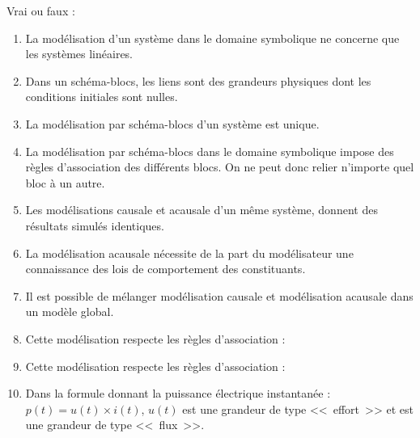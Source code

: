 \documentclass[10pt,fleqn]{article} %
\begin{document}
\def\pathfig{images}

\vspace{8cm}
\pagestyle{fancy}
\thispagestyle{plain}

\def\columnseprulecolor{\color{ocre}}
\setlength{\columnseprule}{0.4pt} 

\def\pathfig{images}


Vrai ou faux : 
\begin{enumerate}
\item La modélisation d’un système dans le domaine symbolique ne concerne que les systèmes linéaires. 
\item Dans un schéma-blocs, les liens sont des grandeurs physiques dont les conditions initiales sont nulles. 
\item La modélisation par schéma-blocs d’un système est unique.
\item La modélisation par schéma-blocs dans le domaine symbolique impose des règles d’association des différents blocs. On ne peut donc relier n’importe quel bloc à un autre.
\item Les modélisations causale et acausale d’un même système, donnent des résultats simulés identiques.
\item La modélisation acausale nécessite de la part du modélisateur une connaissance des lois de comportement des constituants.
\item Il est possible de mélanger modélisation causale et modélisation acausale dans un modèle global.
\item Cette modélisation respecte les règles d’association : 
\item Cette modélisation respecte les règles d’association : 
\item Dans la formule donnant la puissance électrique instantanée : $p(t)=u(t)\times i(t)$, $u(t)$ est une grandeur de type <<~effort~>> et est une grandeur de type <<~flux~>>.

\end{enumerate}
\end{document}

